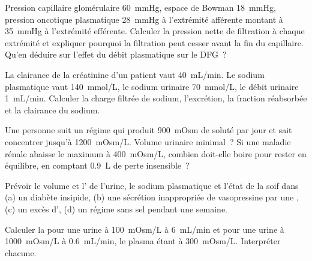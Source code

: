 \begin{exercise}[$\star\star$]\label{exo:b3:renal-osmoregulation:5}
Pression capillaire glomérulaire \qty{60}{mmHg}, espace de Bowman
\qty{18}{mmHg}, pression oncotique plasmatique \qty{28}{mmHg} à
l'extrémité afférente montant à \qty{35}{mmHg} à l'extrémité efférente.
Calculer la pression nette de filtration à chaque extrémité et
expliquer pourquoi la filtration peut cesser avant la fin du capillaire.
Qu'en déduire sur l'effet du débit plasmatique sur le DFG~?
\end{exercise}

\begin{exercise}[$\star\star$]\label{exo:b3:renal-osmoregulation:6}
La clairance de la créatinine d'un patient vaut \qty{40}{mL/min}. Le
sodium plasmatique vaut \qty{140}{mmol/L}, le sodium urinaire
\qty{70}{mmol/L}, le débit urinaire \qty{1}{mL/min}. Calculer la charge
filtrée de sodium, l'excrétion, la fraction réabsorbée et la clairance
du sodium.
\end{exercise}

\begin{exercise}[$\star\star$]\label{exo:b3:renal-osmoregulation:7}
Une personne suit un régime qui produit \qty{900}{mOsm} de soluté par
jour et sait concentrer jusqu'à \qty{1200}{mOsm/L}. Volume urinaire
minimal~? Si une maladie rénale abaisse le maximum à \qty{400}{mOsm/L},
combien doit-elle boire pour rester en équilibre, en comptant
\qty{0.9}{L} de perte insensible~?
\end{exercise}

\begin{exercise}[$\star\star$]\label{exo:b3:renal-osmoregulation:8}
Prévoir le volume et l' de l'urine, le sodium plasmatique et
l'état de la soif dans (a) un diabète insipide, (b) une sécrétion
inappropriée de vasopressine par une , (c) un excès
d', (d) un régime sans sel pendant une semaine.
\end{exercise}

\begin{exercise}[$\star\star$]\label{exo:b3:renal-osmoregulation:9}
Calculer la  pour une urine à \qty{100}{mOsm/L}
à \qty{6}{mL/min} et pour une urine à \qty{1000}{mOsm/L} à
\qty{0.6}{mL/min}, le plasma étant à \qty{300}{mOsm/L}. Interpréter
chacune.
\end{exercise}

